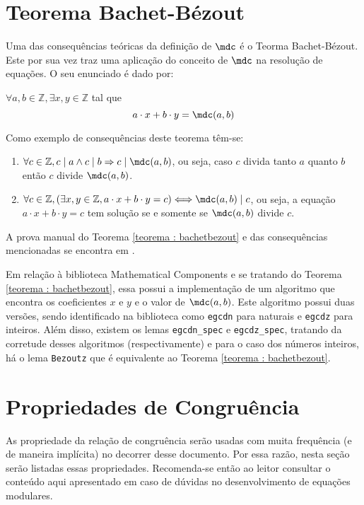 \section{Teorema Bachet-Bézout}

Uma das consequências teóricas da definição de $\mdc$ é o Teorma Bachet-Bézout. Este por sua vez traz uma aplicação do conceito de $\mdc$ na resolução de equações. O seu enunciado é dado por:
\begin{teorema} \label{teorema : bachetbezout}
    $\forall a, b \in \mathbb{Z}, \exists x, y \in \mathbb{Z}$ tal que
    \begin{equation*}
        a \cdot x + b \cdot y = \mdc(a, b)
    \end{equation*}
\end{teorema}
\noindent
Como exemplo de consequências deste teorema têm-se:
\begin{enumerate}
    \item $\forall c \in \mathbb{Z}, c \mid a \land c \mid b \Rightarrow c \mid \mdc(a, b)$, ou seja, caso $c$ divida tanto $a$ quanto $b$ então $c$ divide $\mdc(a, b)$.
    \item $\forall c \in \mathbb{Z}, (\exists x, y \in \mathbb{Z}, a \cdot x + b \cdot y = c) \Longleftrightarrow \mdc(a, b) \mid c $, ou seja, a equação $a \cdot x + b \cdot y = c$ tem solução se e somente se $\mdc(a, b)$ divide $c$.
\end{enumerate}
A prova manual do Teorema \ref{teorema : bachetbezout} e das consequências mencionadas se encontra em \cite{book:2399854}.

    Em relação à biblioteca Mathematical Components e se tratando do Teorema \ref{teorema : bachetbezout}, essa possui a implementação de um algoritmo
    que encontra os coeficientes $x$ e $y$ e o valor de $\mdc(a,b)$. Este algoritmo possui duas versões, sendo identificado na biblioteca como \lstinline[language = coq]{egcdn} para naturais e \lstinline[language = coq]{egcdz} para inteiros. Além disso, existem os lemas \lstinline[language = coq]{egcdn_spec} e \lstinline[language = coq]{egcdz_spec}, tratando da corretude desses algoritmos (respectivamente) e para o caso dos números inteiros, há o lema \lstinline[language = coq]{Bezoutz} que é equivalente ao Teorema \ref{teorema : bachetbezout}.

\section{Propriedades de Congruência}
As propriedade da relação de congruência serão usadas com muita frequência (e de maneira implícita) no decorrer desse documento. Por essa razão, nesta seção serão listadas essas propriedades. Recomenda-se então ao leitor consultar o conteúdo aqui apresentado em caso de dúvidas no desenvolvimento de equações modulares.
    
